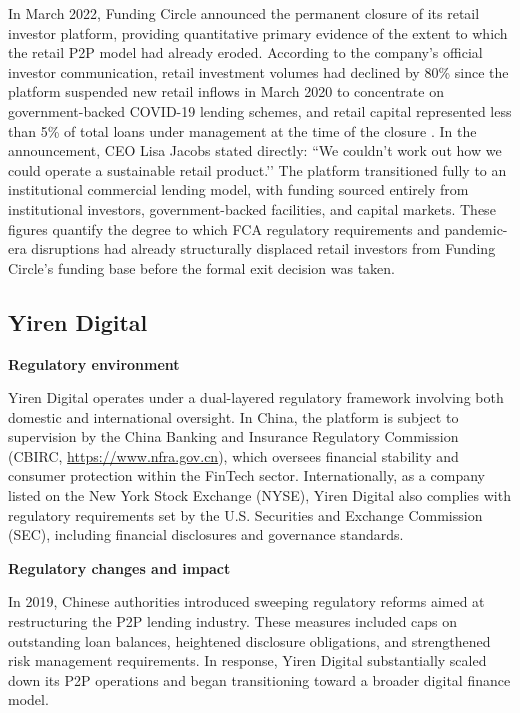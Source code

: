 \documentclass[pdflatex,sn-apa]{sn-jnl}%
\theoremstyle{thmstyleone}%
\theoremstyle{thmstyletwo}%
\theoremstyle{thmstylethree}%
\begin{document}
\textcolor{NavyBlue}{In March 2022, Funding Circle announced the permanent closure of its retail investor platform, providing quantitative primary evidence of the extent to which the retail P2P model had already eroded. According to the company’s official investor communication, retail investment volumes had declined by 80\% since the platform suspended new retail inflows in March 2020 to concentrate on government-backed COVID-19 lending schemes, and retail capital represented less than 5\% of total loans under management at the time of the closure \citep{fundin_circle_retail_2022}. In the announcement, CEO Lisa Jacobs stated directly: ``We couldn’t work out how we could operate a sustainable retail product.’’ The platform transitioned fully to an institutional commercial lending model, with funding sourced entirely from institutional investors, government-backed facilities, and capital markets. These figures quantify the degree to which FCA regulatory requirements and pandemic-era disruptions had already structurally displaced retail investors from Funding Circle’s funding base before the formal exit decision was taken.}

\subsection{Yiren Digital}

\textbf{Regulatory environment}

Yiren Digital operates under a dual-layered regulatory framework involving both domestic and international oversight. In China, the platform is subject to supervision by the China Banking and Insurance Regulatory Commission (CBIRC, \url{https://www.nfra.gov.cn}), which oversees financial stability and consumer protection within the FinTech sector. Internationally, as a company listed on the New York Stock Exchange (NYSE), Yiren Digital also complies with regulatory requirements set by the U.S. Securities and Exchange Commission (SEC), including financial disclosures and governance standards.

\textbf{Regulatory changes and impact}

In 2019, Chinese authorities introduced sweeping regulatory reforms aimed at restructuring the P2P lending industry. These measures included caps on outstanding loan balances, heightened disclosure obligations, and strengthened risk management requirements. In response, Yiren Digital substantially scaled down its P2P operations and began transitioning toward a broader digital finance model.
\end{document}
